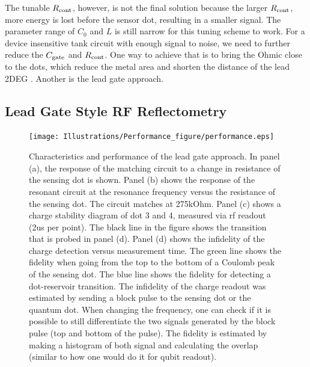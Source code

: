 \documentclass[]{article}
\begin{document}
	The tunable $R_{\rm cont}$, however, is not the final solution because the larger $R_{\rm cont}$, more energy is lost before the sensor dot, resulting in a smaller signal. The parameter range of $C_0$ and $L$ is still narrow for this tuning scheme to work. For a device insensitive tank circuit with enough signal to noise, we need to further reduce the $C_{\rm gate}$ and $R_{\rm cont}$. One way to achieve that is to bring the Ohmic close to the dots, which reduce the metal area and shorten the distance of the lead 2DEG \cite{Connors2020}. Another is the lead gate approach.


\subsection{Lead Gate Style RF Reflectometry} %
\label{sub:capacitive_style_rf_reflectometry}


\begin{figure}
	\texttt{[image: Illustrations/Performance\_figure/performance.eps]}
	\caption{Characteristics and performance of the lead gate approach. In panel (a), the response of the matching circuit to a change in resistance of the sensing dot is shown. 
		Panel (b) shows the response of the resonant circuit at the resonance frequency versus the resistance of the sensing dot. The circuit matches at 275kOhm.
		Panel (c) shows a charge stability diagram of dot 3 and 4, measured via rf readout (2us per point). The black line in the figure shows the transition that is probed in panel (d).
		Panel (d) shows the infidelity of the charge detection versus measurement time. The green line shows the fidelity when going from the top to the bottom of a Coulomb peak of the sensing dot. The blue line shows the fidelity for detecting a dot-reservoir transition. The infidelity of the charge readout was estimated by sending a block pulse to the sensing dot or the quantum dot. When changing the frequency, one can check if it is possible to still differentiate the two signals generated by the block pulse (top and bottom of the pulse). The fidelity is estimated by making a histogram of both signal and calculating the overlap (similar to how one would do it for qubit readout).
	}
	\label{fig:lead_gate_result}
\end{figure}	
\end{document}
